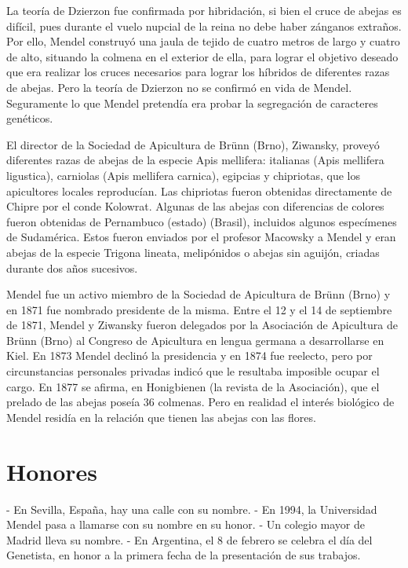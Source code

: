 \documentclass[letterpaper,12pt]{report}
\begin{document}
La teoría de Dzierzon fue confirmada por hibridación, si bien el cruce de abejas es difícil, pues durante el vuelo nupcial de la reina no debe haber zánganos extraños. Por ello, Mendel construyó una jaula de tejido de cuatro metros de largo y cuatro de alto, situando la colmena en el exterior de ella, para lograr el objetivo deseado que era realizar los cruces necesarios para lograr los híbridos de diferentes razas de abejas. Pero la teoría de Dzierzon no se confirmó en vida de Mendel. Seguramente lo que Mendel pretendía era probar la segregación de caracteres genéticos.

El director de la Sociedad de Apicultura de Brünn (Brno), Ziwansky, proveyó diferentes razas de abejas de la especie Apis mellifera: italianas (Apis mellifera ligustica), carniolas (Apis mellifera carnica), egipcias y chipriotas, que los apicultores locales reproducían. Las chipriotas fueron obtenidas directamente de Chipre por el conde Kolowrat. Algunas de las abejas con diferencias de colores fueron obtenidas de Pernambuco (estado) (Brasil), incluidos algunos especímenes de Sudamérica. Estos fueron enviados por el profesor Macowsky a Mendel y eran abejas de la especie Trigona lineata, melipónidos o abejas sin aguijón, criadas durante dos años sucesivos.

Mendel fue un activo miembro de la Sociedad de Apicultura de Brünn (Brno) y en 1871 fue nombrado presidente de la misma. Entre el 12 y el 14 de septiembre de 1871, Mendel y Ziwansky fueron delegados por la Asociación de Apicultura de Brünn (Brno) al Congreso de Apicultura en lengua germana a desarrollarse en Kiel. En 1873 Mendel declinó la presidencia y en 1874 fue reelecto, pero por circunstancias personales privadas indicó que le resultaba imposible ocupar el cargo. En 1877 se afirma, en Honigbienen (la revista de la Asociación), que el prelado de las abejas poseía 36 colmenas. Pero en realidad el interés biológico de Mendel residía en la relación que tienen las abejas con las flores.


\chapter{Honores}

- En Sevilla, España, hay una calle con su nombre.
- En 1994, la Universidad Mendel pasa a llamarse con su nombre en su honor.
- Un colegio mayor de Madrid lleva su nombre.
- En Argentina, el 8 de febrero se celebra el día del Genetista, en honor a la primera fecha de la presentación de sus trabajos.
\end{document}
